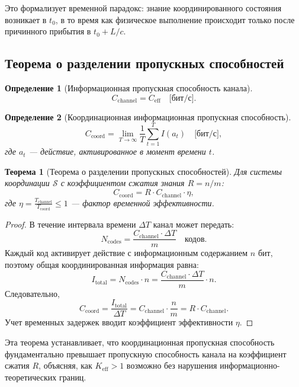 \documentclass[11pt,a4paper]{article}
\newtheorem{theorem}{Теорема}
\newtheorem{definition}{Определение}
\begin{document}
	Это формализует временной парадокс: знание координированного состояния возникает в $t_0$, в то время как физическое выполнение происходит только после причинного прибытия в $t_0 + L/c$.
	
	\subsection{Теорема о разделении пропускных способностей}
	
	\begin{definition}[Информационная пропускная способность канала]
		\[
		C_{\text{channel}} = C_{\text{eff}} \quad \text{[бит/с]}.
		\]
	\end{definition}
	
	\begin{definition}[Координационная информационная пропускная способность]
		\[
		C_{\text{coord}} = \lim_{T \to \infty} \frac{1}{T} \sum_{t=1}^{T} I(a_t) \quad \text{[бит/с]},
		\]
		где $a_t$ — действие, активированное в момент времени $t$.
	\end{definition}
	
	\begin{theorem}[Теорема о разделении пропускных способностей]
		\label{thm:capacity-separation}
		Для системы координации $\mathcal{S}$ с коэффициентом сжатия знания $R = n/m$:
		\[
		C_{\text{coord}} = R \cdot C_{\text{channel}} \cdot \eta,
		\]
		где $\eta = \frac{T_{\text{channel}}}{T_{\text{coord}}} \leq 1$ — фактор временной эффективности.
	\end{theorem}
	
	\begin{proof}
		В течение интервала времени $\Delta T$ канал может передать:
		\[
		N_{\text{codes}} = \frac{C_{\text{channel}} \cdot \Delta T}{m} \quad \text{кодов}.
		\]
		Каждый код активирует действие с информационным содержанием $n$ бит, поэтому общая координированная информация равна:
		\[
		I_{\text{total}} = N_{\text{codes}} \cdot n = \frac{C_{\text{channel}} \cdot \Delta T}{m} \cdot n.
		\]
		Следовательно,
		\[
		C_{\text{coord}} = \frac{I_{\text{total}}}{\Delta T} = C_{\text{channel}} \cdot \frac{n}{m} = R \cdot C_{\text{channel}}.
		\]
		Учет временных задержек вводит коэффициент эффективности $\eta$.
	\end{proof}
	
	Эта теорема устанавливает, что координационная пропускная способность фундаментально превышает пропускную способность канала на коэффициент сжатия $R$, объясняя, как $K_{\mathrm{eff}} > 1$ возможно без нарушения информационно-теоретических границ.
	
\end{document}
